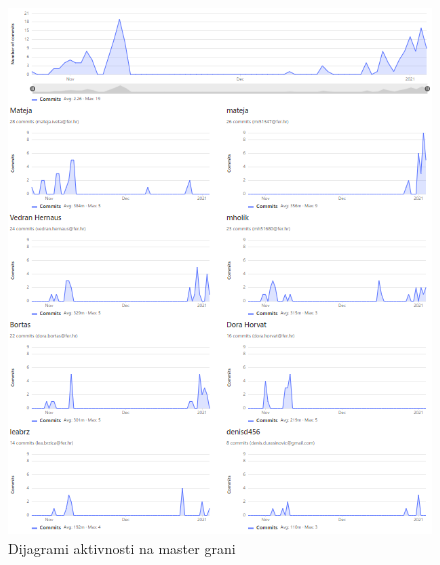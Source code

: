 		\begin{figure}[H]
			\includegraphics[scale=0.9]{slike/repository.png} %
			\centering
			\caption{Dijagrami aktivnosti na master grani}
			\label{fig:aktivnost}
		\end{figure}
					
					
		\eject
	
	
